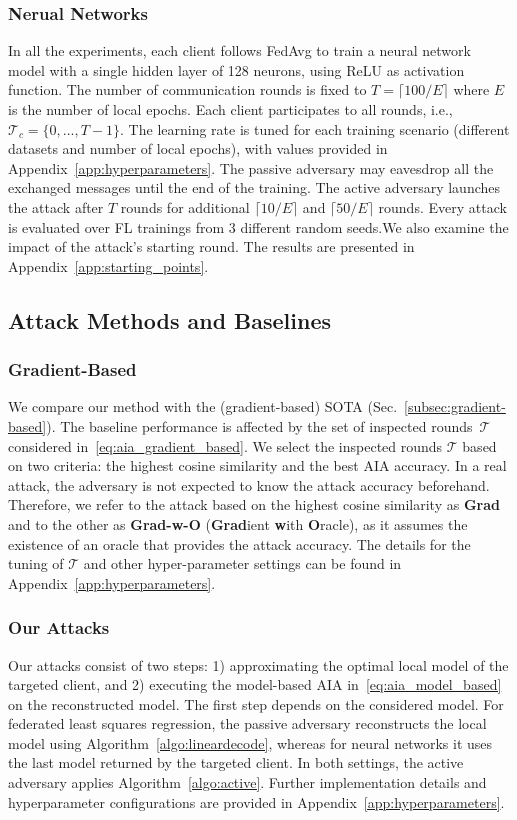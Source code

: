 \subsubsection{Nerual Networks}
In all the experiments, each client follows FedAvg to train a neural network model with a single hidden layer of 128 neurons, using ReLU as activation function. 
The number of communication rounds is fixed to $T = \lceil 100/E \rceil$ where $E$ is the number of local epochs. Each client participates to all rounds, i.e.,~$\mathcal{T}_c = \{0,...,T-1\}$.
The learning rate is tuned for each training scenario (different datasets and number of local epochs), with values provided in Appendix~\ref{app:hyperparameters}. The passive adversary may eavesdrop all the exchanged messages until the end of the training. 
The active adversary launches the attack after $T$ rounds for additional $\lceil 10/E \rceil$ and $\lceil 50/E \rceil$ rounds.
Every attack is evaluated over FL trainings from 3 different random seeds.We also examine the impact of the attack's starting round. The results are presented in Appendix~\ref{app:starting_points}.


\subsection{Attack Methods and Baselines}\label{subsec:baseline}
\subsubsection{Gradient-Based}
We compare our method with the (gradient-based) SOTA (Sec.~\ref{subsec:gradient-based}). 
The baseline performance is affected by the set of  inspected rounds~$\mathcal{T}$ considered in~\eqref{eq:aia_gradient_based}. We select the inspected rounds $\mathcal{T}$ based on two criteria: the highest cosine similarity and the best AIA accuracy. In a real attack, the adversary is not expected to know the attack accuracy beforehand.
Therefore,  we refer to the attack based on the highest cosine similarity as {\bf{Grad}}  and to the other as {\bf{Grad-w-O}} ({\bf Grad}ient {\bf w}ith {\bf O}racle), as it assumes the existence of an oracle that provides the attack accuracy. The details for the tuning of $\mathcal{T}$ and other hyper-parameter settings can be found in Appendix~\ref{app:hyperparameters}.
   
\subsubsection{Our Attacks} 
Our attacks consist of two steps: 1) approximating the optimal local model of the targeted client, and 2) executing the model-based AIA in~\eqref{eq:aia_model_based} on the reconstructed model. The first step depends on the considered model. For federated least squares regression, the passive adversary reconstructs the local model using Algorithm~\ref{algo:lineardecode}, whereas for neural networks it uses the last model returned by the targeted client. In both settings, the active adversary applies Algorithm~\ref{algo:active}. Further implementation details and hyperparameter configurations are provided in Appendix~\ref{app:hyperparameters}.

